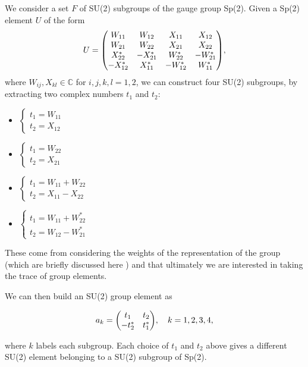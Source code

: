 \documentclass[reqno,12pt]{article}
\numberwithin{equation}{section}
\begin{document}
We consider a set $F$ of SU(2) subgroups of the gauge group Sp(2). Given a Sp(2) element $U$ of the form
\begin{equation}
	U = \mqty(
		W_{11} & W_{12} & X_{11} & X_{12} \\
		W_{21} & W_{22} & X_{21} & X_{22} \\
		X^*_{22} & -X^*_{21} & W^*_{22} & -W^*_{21} \\
		-X^*_{12} & X^*_{11} & -W^*_{12} & W^*_{11}
	),
\end{equation}
where $W_{ij}, X_{kl} \in \mathbb{C}$ for $i,j,k,l = 1, 2$, 
we can construct four SU(2) subgroups, by extracting two complex numbers $t_1$ and $t_2$:
\begin{itemize}
	\item $\begin{cases} t_1 = W_{11} \\ t_2 = X_{12} \end{cases}$
	\item $\begin{cases} t_1 = W_{22} \\ t_2 = X_{21} \end{cases}$
	\item $\begin{cases} t_1 = W_{11} + W_{22} \\ t_2 = X_{11} - X_{22} \end{cases}$
	\item $\begin{cases} t_1 = W_{11} + W^*_{22} \\ t_2 = W_{12} - W^*_{21} \end{cases}$
\end{itemize}

These come from considering the weights of the representation of the group (which are briefly discussed here \cite{pepe}) and that
ultimately we are interested in taking the trace of group elements.

We can then build an SU(2) group element as

\begin{equation} \label{eq:su2element}
	a_k = \mqty(t_1 & t_2 \\ -t_2^* & t_1^*) \qc k = 1, 2, 3, 4,
\end{equation}

where $k$ labels each subgroup. 
Each choice of $t_1$ and $t_2$ above gives a different SU(2) element belonging to a SU(2) subgroup of Sp(2).
\end{document}
